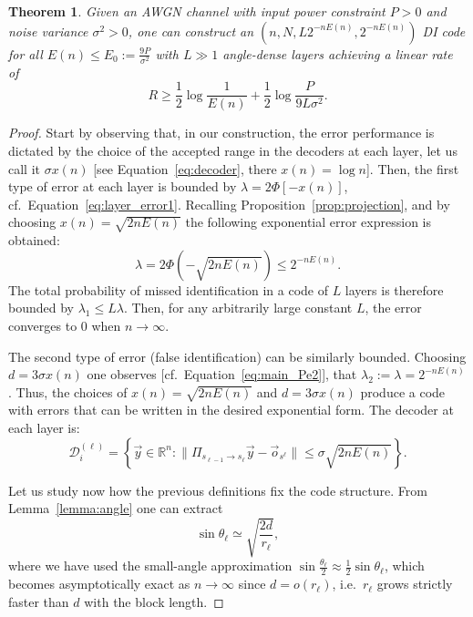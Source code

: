 \documentclass[10pt,conference]{IEEEtran}
\newtheorem{theorem}{Theorem}
\newcommand{\1}{\mathds{1}}
\newcommand{\RR}{\mathbb{R}}
\newcommand{\cD}{\mathcal{D}}
\begin{document}
\begin{theorem}\label{thm:RR}
Given an AWGN channel with input power constraint $P>0$ and noise variance $\sigma^2>0$, one can construct an $(n,N,L2^{-nE(n)},2^{-nE(n)})$ DI code for all $E(n)\leq E_0:=\frac{9P}{\sigma^2}$ with $L\gg1$ angle-dense layers achieving a linear rate of
\[
R\geq \frac12\log\frac{1}{E(n)}+\frac12\log\frac{P}{9L\sigma^2}.
\]
\end{theorem}
\begin{proof}
Start by observing that, in our construction, the error performance is dictated by the choice of the accepted range in the decoders at each layer, let us call it $\sigma x(n)$ [see Equation~\eqref{eq:decoder}, there $x(n)=\log n$]. Then, the first type of error at each layer is bounded by $\lambda=2\Phi[-x(n)]$, cf.~Equation~\eqref{eq:layer_error1}. Recalling Proposition~\ref{prop:projection}, and by choosing $x(n)=\sqrt{2nE(n)}$ the following exponential error expression is obtained:
\begin{equation}
\lambda=2\Phi\left(-\sqrt{2nE(n)}\right)\leq 2^{-nE(n)}.
\end{equation}
The total probability of missed identification in a code of $L$ layers is therefore bounded by $\lambda_1\leq L\lambda$. Then, for any arbitrarily large constant $L$, the error converges to 0 when $n\to\infty$.

The second type of error (false identification) can be similarly bounded. Choosing $d=3\sigma x(n)$ one observes [cf.~Equation~\ref{eq:main_Pe2}], that $\lambda_2:=\lambda=2^{-nE(n)}$. Thus, the choices of $x(n)=\sqrt{2nE(n)}$ and $d=3\sigma x(n)$ produce a code with errors that can be written in the desired exponential form. The decoder at each layer is:
\begin{equation}\label{eq:RR_decoder}
\cD_{i}^{(\ell)}=\left\{\vec{y}\in\RR^n:\|\Pi_{s_{\ell-1}\to s_{\ell}}\vec{y}-\vec{o}_{s^\ell}\|\leq\sigma\sqrt{2nE(n)}\right\}.
\end{equation}

Let us study now how the previous definitions fix the code structure. From Lemma~\ref{lemma:angle} one can extract 
\begin{equation}\label{eq:sin1}
    \sin \theta_\ell\simeq\sqrt{\frac{2d}{r_\ell}},
\end{equation}
where we have used the small-angle approximation $\sin\frac{\theta_{\ell}}{2}\approx\frac12\sin\theta_{\ell}$, which becomes asymptotically exact as $n\to\infty$ since $d=o(r_\ell)$, i.e.~$r_\ell$ grows strictly faster than $d$ with the block length. 


\end{proof}
\end{document}
